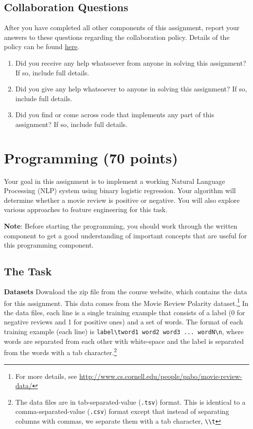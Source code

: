 \documentclass[11pt,addpoints,answers]{exam}
\begin{document}
\begin{questions}
\section{Collaboration Questions}
After you have completed all other components of this assignment, report your answers to these questions regarding the collaboration policy. Details of the policy can be found \href{http://www.cs.cmu.edu/~mgormley/courses/10601/syllabus.html}{here}.
\begin{enumerate}
    \item Did you receive any help whatsoever from anyone in solving this assignment? If so, include full details.
    \item Did you give any help whatsoever to anyone in solving this assignment? If so, include full details.
    \item Did you find or come across code that implements any part of this assignment? If so, include full details.
\end{enumerate}

\begin{your_solution}[height=6cm]

\end{your_solution}
\newpage
\end{questions}
\section{Programming (70 points)}

Your goal in this assignment is to implement a working Natural Language Processing (NLP) system using binary logistic regression. Your algorithm will determine whether a movie review is positive or negative. You will also explore various approaches to feature engineering for this task.

\textbf{Note}: Before starting the programming, you should work through the written component to get a good understanding of important concepts that are useful for this programming component.



\subsection{The Task}\label{task}

{\bf Datasets } 
Download the zip file from the course website, which contains the data for this assignment. This data comes from the Movie Review Polarity dataset.\footnote{For more details, see \url{http://www.cs.cornell.edu/people/pabo/movie-review-data/}} In the data files, each line is a single training example that consists of a label (0 for negative reviews and 1 for positive ones) and a set of words. The format of each training example (each line) is \lstinline{label\tword1 word2 word3 ... wordN\n}, where words are separated from each other with white-space and the label is separated from the words with a tab character.\footnote{The data files are in tab-separated-value (\lstinline{.tsv}) format. This is identical to a comma-separated-value (\lstinline{.csv}) format except that instead of separating columns with commas, we separate them with a tab character, \lstinline{\\t}}
\end{document}
